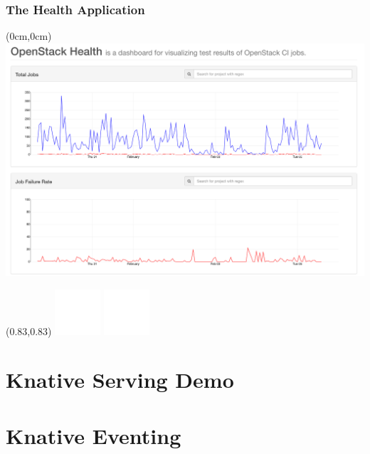 \documentclass[aspectratio=169,11pt,hyperref={colorlinks=true}]{beamer}
\begin{document}
\begin{lblackrwhiteframe}
\begin{grayframe}
  \frametitle{The Health Application}
  \begin{textblock*}{\paperwidth}(0cm,0cm)
    \includegraphics[width=\paperwidth, height=\paperheight]{img/openstack-health.png}
  \end{textblock*}
  \begin{textblock*}{0.2\paperwidth}(0.83\paperwidth,0.83\paperheight)
    \includegraphics[width=0.03\paperwidth]{img/cc.png}
    \includegraphics[width=0.03\paperwidth]{img/zero.png}
  \end{textblock*}
\end{grayframe}

\section{Knative Serving Demo}

\section{Knative Eventing}


\end{lblackrwhiteframe}
\end{document}
